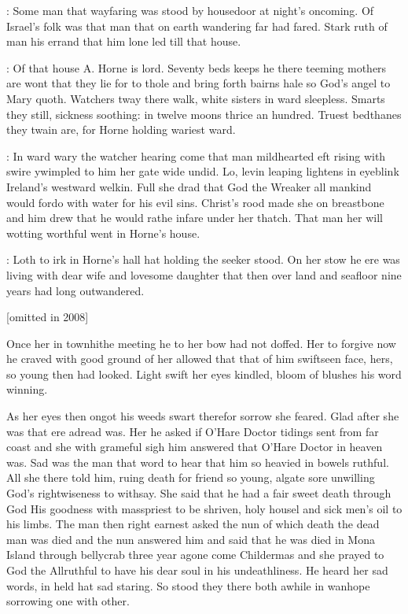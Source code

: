 

: Some man that wayfaring was stood by housedoor at night's
oncoming. Of Israel's folk was that man that on earth wandering far had
fared. Stark ruth of man his errand that him lone led till that house.


: Of that house A. Horne is lord. Seventy beds keeps he there teeming
mothers are wont that they lie for to thole and bring forth bairns hale so
God's angel to Mary quoth. Watchers tway there walk, white sisters in
ward sleepless.
Smarts they still, sickness soothing: in twelve moons
thrice an hundred. Truest bedthanes they twain are, for Horne holding
wariest ward.


: In ward wary the watcher hearing come that man mildhearted eft
rising with swire ywimpled to him her gate wide undid.
Lo, levin leaping
lightens in eyeblink Ireland's westward welkin. Full she drad that God the
Wreaker all mankind would fordo with water for his evil sins. Christ's
rood made she on breastbone and him drew that he would rathe infare under
her thatch. That man her will wotting worthful went in Horne's house.



: Loth to irk in Horne's hall hat holding the seeker stood. On her stow
he ere was living with dear wife and lovesome daughter that then over land
and seafloor nine years had long outwandered.

[omitted in 2008]

Once her in townhithe
meeting he to her bow had not doffed. Her to forgive now he craved with
good ground of her allowed that that of him swiftseen face, hers, so young
then had looked. Light swift her eyes kindled, bloom of blushes his word
winning.


As her eyes then ongot his weeds swart therefor sorrow she feared.
Glad after she was that ere adread was. Her he asked if O'Hare Doctor
tidings sent from far coast and she with grameful sigh him answered that
O'Hare Doctor in heaven was. Sad was the man that word to hear that him
so heavied in bowels ruthful. All she there told him, ruing death for
friend so young, algate sore unwilling God's rightwiseness to withsay. She
said that he had a fair sweet death through God His goodness with
masspriest to be shriven, holy housel and sick men's oil to his limbs. The
man then right earnest asked the nun of which death the dead man was died
and the nun answered him and said that he was died in Mona Island through
bellycrab three year agone come Childermas and she prayed to God the
Allruthful to have his dear soul in his undeathliness. He heard her sad
words, in held hat sad staring. So stood they there both awhile in wanhope
sorrowing one with other.

